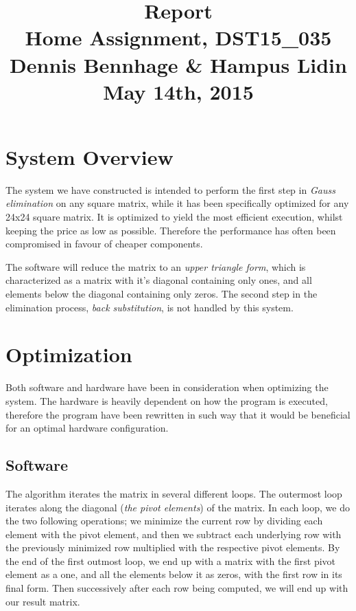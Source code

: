 \documentclass[a4paper,9pt,fleqn]{article}
\title{
{\bf Report}\\
\vspace{0.2cm}
%
Home Assignment, DST15\_035\\
\vspace{1cm}
%
{\large Dennis Bennhage \& Hampus Lidin}\\
\vspace{10cm}
%
May 14th, 2015
}
\date{}
\begin{document}
\maketitle

\newpage

\section{System Overview}
The system we have constructed is intended to perform the first step in {\it Gauss elimination}
on any square matrix, while it has been specifically optimized for any 24x24 square matrix.
It is optimized to yield the most efficient execution, whilst keeping the price as low as
possible. Therefore the performance has often been compromised in favour of cheaper components.

The software will reduce the matrix to an {\it upper triangle form}, which is characterized
as a matrix with it's diagonal containing only ones, and all elements below the diagonal
containing only zeros. The second step in the elimination process, {\it back substitution},
is not handled by this system.

\section{Optimization}
Both software and hardware have been in consideration when optimizing the system. The hardware
is heavily dependent on how the program is executed, therefore the program have been 
rewritten in such way that it would be beneficial for an optimal hardware configuration.

\subsection{Software}
The algorithm iterates the matrix in several different loops. The outermost loop iterates along
the diagonal ({\it the pivot elements}) of the matrix. In each loop, we do the two following
operations; we minimize the current row by dividing each element with the pivot element, and then we
subtract each underlying row with the previously minimized row multiplied with the respective
pivot elements. By the end of the first outmost loop, we end up with a matrix with the first pivot
element as a one, and all the elements below it as zeros, with the first row in its final form.
Then successively after each row being computed, we will end up with our result matrix.
\end{document}
